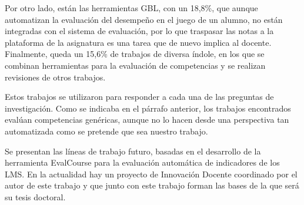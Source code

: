 Por otro lado, están las herramientas GBL, con un 18,8\%, que aunque automatizan la evaluación del desempeño en el juego de un alumno, no están integradas con el sistema de evaluación, por lo que traspasar las notas a la plataforma de la asignatura es una tarea que de nuevo implica al docente. Finalmente, queda un 15,6\% de trabajos de diversa índole, en los que se combinan herramientas para la evaluación de competencias y se realizan revisiones de otros trabajos.

Estos trabajos se utilizaron para responder a cada una de las preguntas de investigación. Como se indicaba en el párrafo anterior, los trabajos encontrados evalúan competencias genéricas, aunque no lo hacen desde una perspectiva tan automatizada como se pretende que sea nuestro trabajo.

Se presentan las líneas de trabajo futuro, basadas en el desarrollo de la herramienta EvalCourse para la evaluación automática de indicadores de los LMS. En la actualidad hay un proyecto de Innovación Docente coordinado por el autor de este trabajo y que junto con este trabajo forman las bases de la que será su tesis doctoral.




